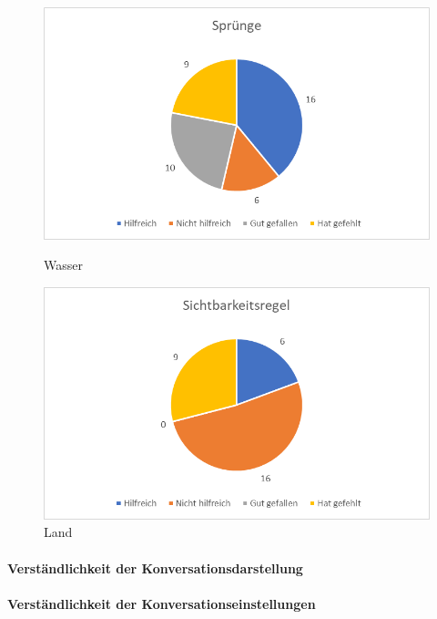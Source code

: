 \begin{figure}
   \begin{minipage}[b]{.49\linewidth} %
      \includegraphics[width=\linewidth]{pictures/diagramme/aussagenspr}
      \caption{Wasser}
   \end{minipage}
   \hspace{.01\linewidth}%
   \begin{minipage}[b]{.49\linewidth} %
      \includegraphics[width=\linewidth]{pictures/diagramme/aussagensichtb}
      \caption{Land}
   \end{minipage}
\end{figure}

\paragraph{Verständlichkeit der Konversationsdarstellung}
\paragraph{Verständlichkeit der Konversationseinstellungen}

